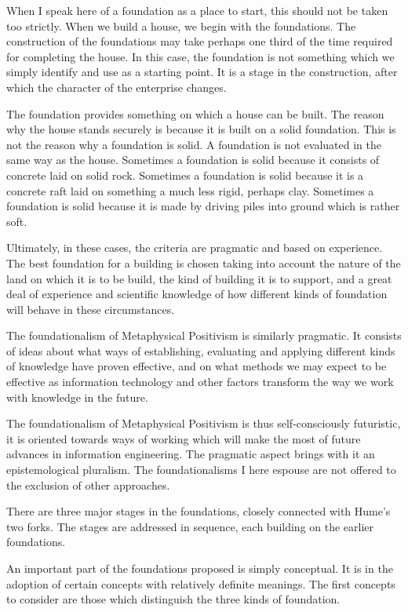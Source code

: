 When I speak here of a foundation as a place to start, this should not
be taken too strictly.
When we build a house, we begin with the foundations.
The construction of the foundations may take perhaps one third of the
time required for completing the house.
In this case, the foundation is not something which we simply identify
and use as a starting point.
It is a stage in the construction, after which the character of the
enterprise changes.

The foundation provides something on which a house can be built.
The reason why the house stands securely is because it is built on a
solid foundation.
This is not the reason why a foundation is solid.
A foundation is not evaluated in the same way as the house.
Sometimes a foundation is solid because it consists of concrete laid
on solid rock.
Sometimes a foundation is solid because it is a concrete raft laid on
something a much less rigid, perhaps clay.
Sometimes a foundation is solid because it is made by driving piles
into ground which is rather soft.

Ultimately, in these cases, the criteria are pragmatic and based on
experience.
The best foundation for a building is chosen taking into account the
nature of the land on which it is to be build, the kind of building it
is to support, and a great deal of experience and scientific knowledge
of how different kinds of foundation will behave in these
circumstances.

The foundationalism of Metaphysical Positivism is similarly pragmatic.
It consists of ideas about what ways of establishing, evaluating and
applying different kinds of knowledge have proven effective, and on
what methods we may expect to be effective as information technology
and other factors transform the way we work with knowledge in the
future.

The foundationalism of Metaphysical Positivism is thus
self-consciously futuristic, it is oriented towards ways of working
which will make the most of future advances in information
engineering. 
The pragmatic aspect brings with it an epistemological pluralism.
The foundationalisms I here espouse are not offered to the exclusion
of other approaches.

There are three major stages in the foundations, closely connected
with Hume's two forks.
The stages are addressed in sequence, each building on the earlier
foundations.

An important part of the foundations proposed is simply conceptual.
It is in the adoption of certain concepts with relatively definite
meanings.
The first concepts to consider are those which distinguish the three
kinds of foundation.

